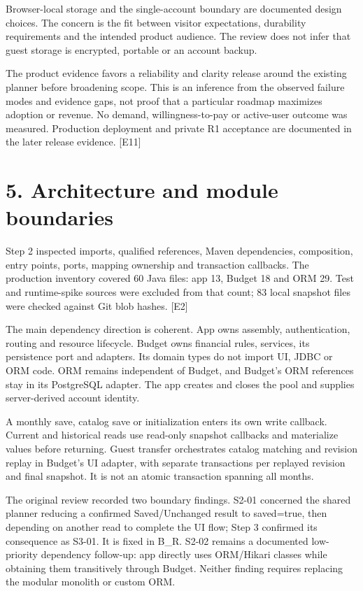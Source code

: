 \documentclass[11pt,a4paper]{article}
\begin{document}
Browser-local storage and the single-account boundary are documented design choices. The concern is the fit between visitor expectations, durability requirements and the intended product audience. The review does not infer that guest storage is encrypted, portable or an account backup.

The product evidence favors a reliability and clarity release around the existing planner before broadening scope. This is an inference from the observed failure modes and evidence gaps, not proof that a particular roadmap maximizes adoption or revenue. No demand, willingness-to-pay or active-user outcome was measured. Production deployment and private R1 acceptance are documented in the later release evidence. [E11]

\section*{5. Architecture and module boundaries}

Step 2 inspected imports, qualified references, Maven dependencies, composition, entry points, ports, mapping ownership and transaction callbacks. The production inventory covered 60 Java files: app 13, Budget 18 and ORM 29. Test and runtime-spike sources were excluded from that count; 83 local snapshot files were checked against Git blob hashes. [E2]

The main dependency direction is coherent. App owns assembly, authentication, routing and resource lifecycle. Budget owns financial rules, services, its persistence port and adapters. Its domain types do not import UI, JDBC or ORM code. ORM remains independent of Budget, and Budget's ORM references stay in its PostgreSQL adapter. The app creates and closes the pool and supplies server-derived account identity.

A monthly save, catalog save or initialization enters its own write callback. Current and historical reads use read-only snapshot callbacks and materialize values before returning. Guest transfer orchestrates catalog matching and revision replay in Budget's UI adapter, with separate transactions per replayed revision and final snapshot. It is not an atomic transaction spanning all months.

The original review recorded two boundary findings. S2-01 concerned the shared planner reducing a confirmed Saved/\allowbreak{}Unchanged result to saved=true, then depending on another read to complete the UI flow; Step 3 confirmed its consequence as S3-01. It is fixed in B\_R. S2-02 remains a documented low-priority dependency follow-up: app directly uses ORM/\allowbreak{}Hikari classes while obtaining them transitively through Budget. Neither finding requires replacing the modular monolith or custom ORM.
\end{document}
